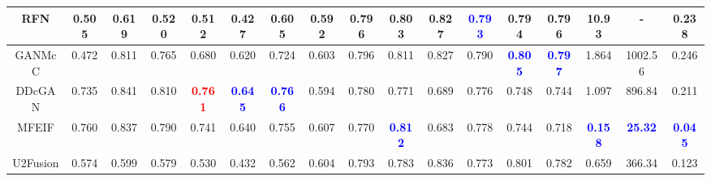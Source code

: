\documentclass[10pt,twocolumn,letterpaper]{article}
\begin{document}
\begin{table*}[!htb]
\begin{tabular}{|c|cccccc|c|ccccc|c|ccc|}
		\footnotesize RFN&\footnotesize 0.505 &\footnotesize 0.619 &\footnotesize 0.520 &\footnotesize 0.512 &\footnotesize 0.427 &\footnotesize 0.605 &\footnotesize 0.592 &\footnotesize 0.796 &\footnotesize 0.803 &\footnotesize 0.827 &\footnotesize \textcolor{blue}{\textbf{0.793}} &\footnotesize 0.794 &\footnotesize 0.796 &\footnotesize 10.93&- &\footnotesize 0.238 \\
		\hline 
		
		\footnotesize GANMcC&\footnotesize 0.472&\footnotesize 0.811&\footnotesize 0.765&\footnotesize  0.680&\footnotesize  0.620&\footnotesize 0.724&\footnotesize 0.603&\footnotesize 0.796&\footnotesize 0.811&\footnotesize 0.827&\footnotesize 0.790&\footnotesize \textcolor{blue}{\textbf{0.805}}&\footnotesize \textcolor{blue}{\textbf{0.797}} &\footnotesize 1.864&\footnotesize 1002.56 &\footnotesize 0.246\\
		\hline 
		
		\footnotesize DDcGAN&\footnotesize 0.735&\footnotesize 0.841&\footnotesize 0.810&\footnotesize  \textcolor{red}{\textbf{0.761}}&\footnotesize  \textcolor{blue}{\textbf{0.645}}&\footnotesize \textcolor{blue}{\textbf{0.766}}&\footnotesize 0.594&\footnotesize 0.780&\footnotesize 0.771&\footnotesize 0.689&\footnotesize 0.776&\footnotesize 0.748&\footnotesize 0.744 &\footnotesize 1.097 &\footnotesize 896.84 &\footnotesize 0.211\\
		
		\hline  
		\footnotesize MFEIF&\footnotesize 0.760&\footnotesize 0.837&\footnotesize 0.790&\footnotesize  0.741&\footnotesize  0.640&\footnotesize 0.755&\footnotesize 0.607&\footnotesize 0.770&\footnotesize \textcolor{blue}{\textbf{0.812}}&\footnotesize 0.683&\footnotesize 0.778&\footnotesize 0.744&\footnotesize 0.718 &\footnotesize \textcolor{blue}{\textbf{0.158}} &\footnotesize \textcolor{blue}{\textbf{25.32}} &\footnotesize \textcolor{blue}{\textbf{0.045}} \\
		\hline 
		\footnotesize U2Fusion&\footnotesize 0.574&\footnotesize 0.599&\footnotesize 0.579&\footnotesize 0.530&\footnotesize  0.432&\footnotesize 0.562&\footnotesize 0.604&\footnotesize 0.793&\footnotesize 0.783&\footnotesize 0.836&\footnotesize 0.773&\footnotesize 0.801&\footnotesize 0.782 &\footnotesize 0.659 &\footnotesize 366.34 &\footnotesize 0.123\\
		\hline 
		

\end{tabular}
\end{table*}
\end{document}
